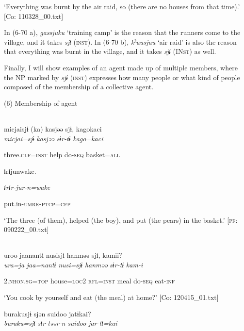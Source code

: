 \glt ‘Everything was burnt by the air raid, so (there are no houses from that time).’ [Co: 110328\_00.txt]
\z

In (6-70 a), \textit{gassjuku} ‘training camp’ is the reason that the runners come to the village, and it takes \textit{sjɨ} (\textsc{inst}). In (6-70 b), \textit{kˀuusjuu} ‘air raid’ is also the reason that everything was burnt in the village, and it takes \textit{sjɨ} (IN\textsc{st}) as well.

Finally, I will show examples of an agent made up of multiple members, where the NP marked by \textit{sjɨ} (\textsc{inst}) expresses how many people or what kind of people composed of the membership of a collective agent.

(6)  Membership of agent

 \ea{}\\
\gll  {\TM}  micjaisjɨ  (ka)  kasjəə  sjɨ,  kagokaci\\

      \textit{micjai=sjɨ}    \textit{kasjəə}  \textit{sɨr-tɨ}  \textit{kago=kaci}

      three.\textsc{clf}=\textsc{inst}    help  do-\textsc{seq}  basket=\textsc{all}

      ɨrɨjunwake.

      \textit{ɨrɨr-jur-n=wake}

      put.in-\textsc{umrk}-\textsc{ptcp}=\textsc{cfp}

\glt ‘The three (of them), helped (the boy), and put (the pears) in the basket.’ [\textsc{pf}: 090222\_00.txt]
\z

 \ex{}\\
{\TM}
\gll  uroo  jaanantɨ  nusisjɨ  hanməə  sjɨ,  kamii?\\

      \textit{ura=ja}  \textit{jaa=nantɨ}  \textit{nusi=sjɨ}  \textit{hanməə}  \textit{sɨr-tɨ}  \textit{kam-i}

      2.\textsc{nhon}.\textsc{sg}=\textsc{top}  house=\textsc{loc}2  \textsc{rfl}=\textsc{inst}  meal  do-\textsc{seq}  eat-\textsc{inf}

\glt ‘You cook by yourself and eat (the meal) at home?’ [Co: 120415\_01.txt]
\z

 \ex {\TM}  burakusjɨ  sjən  {\textbar}suidoo{\textbar}  jatɨkai?\\
\gll \textit{buraku=sjɨ}  \textit{sɨr-təər-n}  \textit{suidoo}  \textit{jar-tɨ=kai}\\

